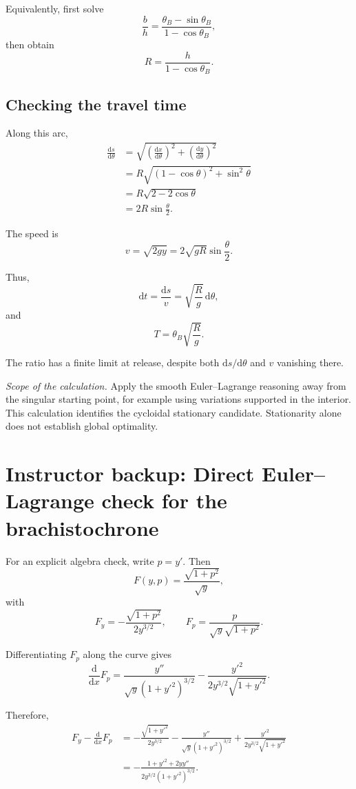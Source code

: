 \documentclass[11pt,a4paper]{article}
\newcommand{\dd}{\mathrm{d}}
\begin{document}
Equivalently, first solve
\[
\frac bh
=
\frac{\theta_B-\sin\theta_B}{1-\cos\theta_B},
\]
then obtain
\[
R=\frac{h}{1-\cos\theta_B}.
\]

\subsection*{Checking the travel time}

Along this arc,
\begin{align*}
\frac{\dd s}{\dd\theta}
&=
\sqrt{
\left(\frac{\dd x}{\dd\theta}\right)^2+
\left(\frac{\dd y}{\dd\theta}\right)^2
}\\
&=
R\sqrt{(1-\cos\theta)^2+\sin^2\theta}\\
&=
R\sqrt{2-2\cos\theta}\\
&=
2R\sin\frac\theta2.
\end{align*}

The speed is
\[
v=\sqrt{2gy}
=
2\sqrt{gR}\sin\frac\theta2.
\]

Thus,
\[
\dd t
=
\frac{\dd s}{v}
=
\sqrt{\frac Rg}\,\dd\theta,
\]
and
\[
\boxed{
T=\theta_B\sqrt{\frac Rg}.
}
\]

The ratio has a finite limit at release, despite both
\(\dd s/\dd\theta\) and \(v\) vanishing there.

\textit{Scope of the calculation.}
Apply the smooth Euler--Lagrange reasoning away from the singular
starting point, for example using variations supported in the
interior. This calculation identifies the cycloidal stationary
candidate. Stationarity alone does not establish global optimality.

\section*{Instructor backup: Direct Euler--Lagrange check for the brachistochrone}

For an explicit algebra check, write \(p=y'\). Then
\[
F(y,p)=\frac{\sqrt{1+p^2}}{\sqrt y},
\]
with
\[
F_y=-\frac{\sqrt{1+p^2}}{2y^{3/2}},
\qquad
F_p=\frac{p}{\sqrt y\sqrt{1+p^2}}.
\]

Differentiating \(F_p\) along the curve gives
\[
\frac{\dd}{\dd x}F_p
=
\frac{y''}{\sqrt y(1+y'^2)^{3/2}}
-
\frac{y'^2}{2y^{3/2}\sqrt{1+y'^2}}.
\]

Therefore,
\begin{align*}
F_y-\frac{\dd}{\dd x}F_p
&=
-\frac{\sqrt{1+y'^2}}{2y^{3/2}}
-\frac{y''}{\sqrt y(1+y'^2)^{3/2}}
+\frac{y'^2}{2y^{3/2}\sqrt{1+y'^2}}\\
&=
-\frac{1+y'^2+2yy''}
{2y^{3/2}(1+y'^2)^{3/2}}.
\end{align*}
\end{document}
